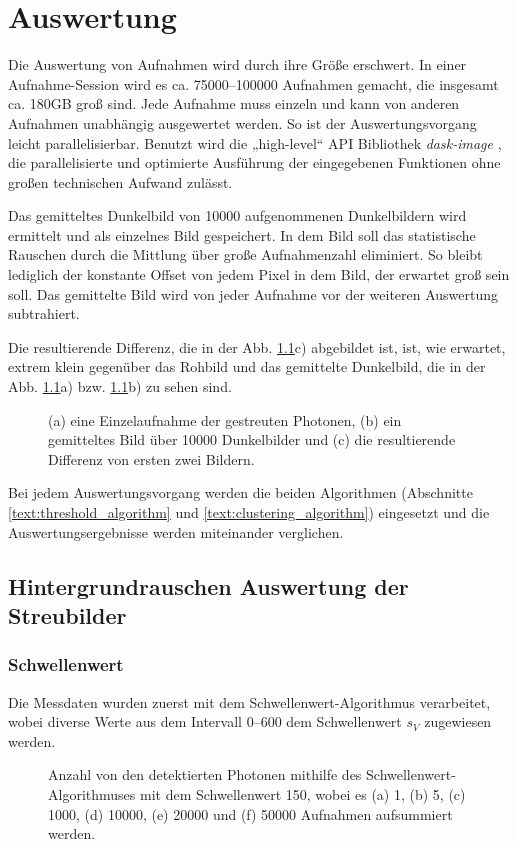 \chapter{Auswertung}
\label{text:auswertung}
Die Auswertung von Aufnahmen wird durch ihre Größe erschwert. In einer Aufnahme-Session wird es ca. \numrange{75000}{100000} Aufnahmen gemacht, die insgesamt ca. 180GB groß sind. Jede Aufnahme muss einzeln und kann von anderen Aufnahmen unabhängig ausgewertet werden. So ist der Auswertungsvorgang leicht parallelisierbar. Benutzt wird die „high-level“ API Bibliothek \textit{dask-image} \cite{dask-library}, die parallelisierte und optimierte Ausführung der eingegebenen Funktionen ohne großen technischen Aufwand zulässt.

\noindent
Das gemitteltes Dunkelbild von \num{10000} aufgenommenen Dunkelbildern wird ermittelt und als einzelnes Bild gespeichert. In dem Bild soll das statistische Rauschen durch die Mittlung über große Aufnahmenzahl eliminiert. So bleibt lediglich der konstante Offset von jedem Pixel in dem Bild, der erwartet groß sein soll. Das gemittelte Bild wird von jeder Aufnahme vor der weiteren Auswertung subtrahiert.

\noindent
Die resultierende Differenz, die in der Abb. \ref{fig:capture_ped_diff}c) abgebildet ist, ist, wie erwartet, extrem klein gegenüber das Rohbild und das gemittelte Dunkelbild, die in der Abb. \ref{fig:capture_ped_diff}a) bzw. \ref{fig:capture_ped_diff}b) zu sehen sind. 
\begin{figure}[H]
    \centering
    
    \caption{(a) eine Einzelaufnahme der gestreuten Photonen, (b) ein gemitteltes Bild über \num{10000} Dunkelbilder und (c) die resultierende Differenz von ersten zwei Bildern.}
    \label{fig:capture_ped_diff}
\end{figure}

\noindent
Bei jedem Auswertungsvorgang werden die beiden Algorithmen (Abschnitte \ref{text:threshold_algorithm} und \ref{text:clustering_algorithm}) eingesetzt und die Auswertungsergebnisse werden miteinander verglichen.
\section{Hintergrundrauschen Auswertung der Streubilder}
\label{text:streuung_counting}
\subsection{Schwellenwert}
Die Messdaten wurden zuerst mit dem Schwellenwert-Algorithmus verarbeitet, wobei diverse Werte aus dem Intervall \SIrange{0}{600}{\adu} dem Schwellenwert $s_V$ zugewiesen werden.
\begin{figure}[H]
    \centering
    
    \caption{Anzahl von den detektierten Photonen mithilfe des Schwellenwert-Algorithmuses mit dem Schwellenwert \SI{150}{\adu}, wobei es (a) \num{1}, (b) \num{5}, (c) \num{1000}, (d) \num{10000}, (e) \num{20000} und (f) \num{50000} Aufnahmen aufsummiert werden.}
    \label{fig:th_150_sums}
\end{figure}


